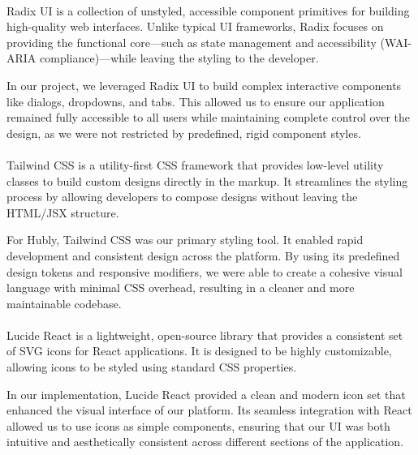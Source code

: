 \paragraph{}Radix UI is a collection of unstyled\cite{radixui}, accessible component primitives for building high-quality web interfaces. Unlike typical UI frameworks, Radix focuses on providing the functional core—such as state management and accessibility (WAI-ARIA compliance)—while leaving the styling to the developer.

In our project, we leveraged Radix UI to build complex interactive components like dialogs, dropdowns, and tabs. This allowed us to ensure our application remained fully accessible to all users while maintaining complete control over the design, as we were not restricted by predefined, rigid component styles.

\paragraph{}Tailwind CSS is a utility-first CSS framework\cite{tailwindcss} that provides low-level utility classes to build custom designs directly in the markup. It streamlines the styling process by allowing developers to compose designs without leaving the HTML/JSX structure.

For Hubly, Tailwind CSS was our primary styling tool. It enabled rapid development and consistent design across the platform. By using its predefined design tokens and responsive modifiers, we were able to create a cohesive visual language with minimal CSS overhead, resulting in a cleaner and more maintainable codebase.


\paragraph{}Lucide React is a lightweight, open-source library\cite{lucidereact} that provides a consistent set of SVG icons for React applications. It is designed to be highly customizable, allowing icons to be styled using standard CSS properties.

In our implementation, Lucide React provided a clean and modern icon set that enhanced the visual interface of our platform. Its seamless integration with React allowed us to use icons as simple components, ensuring that our UI was both intuitive and aesthetically consistent across different sections of the application.

